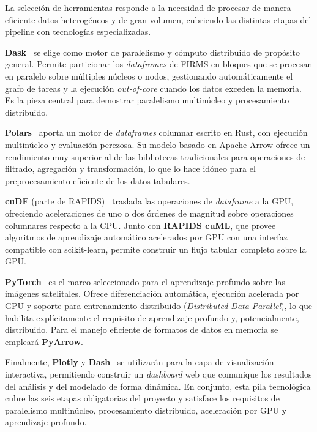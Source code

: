 La selección de herramientas responde a la necesidad de procesar de manera eficiente datos heterogéneos y de gran volumen, cubriendo las distintas etapas del pipeline con tecnologías especializadas.

\textbf{Dask}~\cite{rocklin2015} se elige como motor de paralelismo y cómputo distribuido de propósito general. Permite particionar los \textit{dataframes} de FIRMS en bloques que se procesan en paralelo sobre múltiples núcleos o nodos, gestionando automáticamente el grafo de tareas y la ejecución \textit{out-of-core} cuando los datos exceden la memoria. Es la pieza central para demostrar paralelismo multinúcleo y procesamiento distribuido.

\textbf{Polars}~\cite{polars} aporta un motor de \textit{dataframes} columnar escrito en Rust, con ejecución multinúcleo y evaluación perezosa. Su modelo basado en Apache Arrow ofrece un rendimiento muy superior al de las bibliotecas tradicionales para operaciones de filtrado, agregación y transformación, lo que lo hace idóneo para el preprocesamiento eficiente de los datos tabulares.

\textbf{cuDF} (parte de RAPIDS)~\cite{rapids} traslada las operaciones de \textit{dataframe} a la GPU, ofreciendo aceleraciones de uno o dos órdenes de magnitud sobre operaciones columnares respecto a la CPU. Junto con \textbf{RAPIDS cuML}, que provee algoritmos de aprendizaje automático acelerados por GPU con una interfaz compatible con scikit-learn, permite construir un flujo tabular completo sobre la GPU.

\textbf{PyTorch}~\cite{paszke2019} es el marco seleccionado para el aprendizaje profundo sobre las imágenes satelitales. Ofrece diferenciación automática, ejecución acelerada por GPU y soporte para entrenamiento distribuido (\textit{Distributed Data Parallel}), lo que habilita explícitamente el requisito de aprendizaje profundo y, potencialmente, distribuido. Para el manejo eficiente de formatos de datos en memoria se empleará \textbf{PyArrow}.

Finalmente, \textbf{Plotly} y \textbf{Dash}~\cite{plotly} se utilizarán para la capa de visualización interactiva, permitiendo construir un \textit{dashboard} web que comunique los resultados del análisis y del modelado de forma dinámica. En conjunto, esta pila tecnológica cubre las seis etapas obligatorias del proyecto y satisface los requisitos de paralelismo multinúcleo, procesamiento distribuido, aceleración por GPU y aprendizaje profundo.

